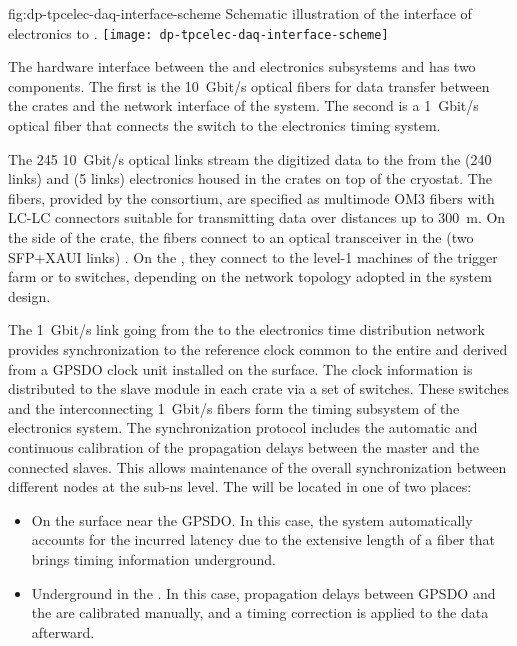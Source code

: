\begin{dunefigure}{fig:dp-tpcelec-daq-interface-scheme}
{Schematic illustration of the interface of   electronics to .}
\texttt{[image: dp-tpcelec-daq-interface-scheme]}
\end{dunefigure}

The hardware interface between the   and  electronics subsystems and  has two components. The first %
is the \SI{10}{Gbit/s} optical fibers for data transfer between the  crates and the network interface of the  system. The second %
is a \SI{1}{Gbit/s} optical fiber that connects the   switch to the  electronics timing system.   


The \num{245} \SI{10}{Gbit/s} optical links stream the digitized data to the  from the  (\num{240} links) and  (\num{5} links) electronics housed in  the  crates on top of the cryostat.  The fibers, provided by the  consortium, are specified as multimode OM3 fibers \cite{om3fibers} with LC-LC connectors suitable for transmitting data over distances up to \SI{300}{\metre}.   On the side of the  crate, the fibers connect to an optical transceiver in the  (two SFP+XAUI links) \cite{natmch}.  On the , they connect to the level-1 machines of the trigger farm or to switches, depending on the network topology adopted in the  system design.

The \SI{1}{Gbit/s} link going from the  to the  electronics time distribution network provides synchronization to the reference clock common %
to the entire  and derived from a GPSDO clock unit installed on the surface. The clock information is distributed to the  slave module in each  crate via a set of  switches. These switches and the interconnecting \SI{1}{Gbit/s} fibers form the timing subsystem of the  electronics system. %
The  synchronization protocol includes the automatic and continuous calibration of the propagation delays between the master and the connected slaves. This allows maintenance of the  overall synchronization between different nodes at the sub-ns level. The  will be located in one of two places:
\begin{itemize}
\item{On the surface near the GPSDO. In this case, the system automatically accounts for the incurred latency due to the extensive length of a fiber that brings timing information underground.}
\item{Underground in the . In this case, propagation delays between GPSDO and the  are calibrated manually, and a timing correction is applied to the data afterward.}
\end{itemize} 



